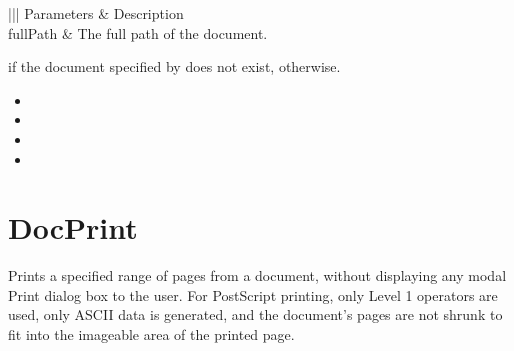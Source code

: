 \documentclass[letterpaper,12pt,english,openany,oneside]{sphinxmanual}
\begin{document}

\begin{sphinxVerbatim}[commandchars=\\\{\}]
\PYG{p}{[} \PYG{p}{]}
\end{sphinxVerbatim}
\label{\detokenize{IAC_API_DDE_Messages:parameters-10}}


\begin{savenotes}\sphinxattablestart
\centering
{}\label{\detokenize{IAC_API_DDE_Messages:section-10}}\nobreak
\begin{tabular}[t]{|||}
\hline
\sphinxstyletheadfamily 
Parameters
&\sphinxstyletheadfamily 
Description
\\
\hline
fullPath
&
The full path of the document.
\\
\hline
\end{tabular}
\par
\sphinxattableend\end{savenotes}


 if the document specified by  does not exist,  otherwise.

\label{\detokenize{IAC_API_DDE_Messages:related-methods-11}}
\begin{itemize}
\item {} 

\item {} 

\item {} 

\item {} 

\end{itemize}




\section{DocPrint}
\label{\detokenize{IAC_API_DDE_Messages:id29}}
Prints a specified range of pages from a document, without displaying any modal Print dialog box to the user. For PostScript printing, only Level 1 operators are used, only ASCII data is generated, and the document’s pages are not shrunk to fit into the imageable area of the printed page.
\end{document}
